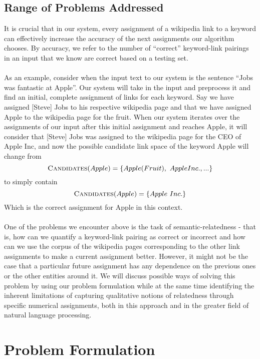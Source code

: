 \documentclass[twoside,11pt]{article}
\begin{document}
\subsection{Range of Problems Addressed}

It is crucial that in our system, every assignment of a wikipedia link to a keyword can effectively increase the accuracy of the next assignments our algorithm chooses. By accuracy, we refer to the number of ``correct'' keyword-link pairings in an input that we know are correct based on a testing set.
\\ \\
As an example, consider when the input text to our system is the sentence ``Jobs was fantastic at Apple''. Our system will take in the input and preprocess it and find an initial, complete assignment of links for each keyword. Say we have assigned [Steve] Jobs to his respective wikipedia page and that we have assigned Apple to the wikipedia page for the fruit. When our system iterates over the assignments of our input after this initial assignment and reaches Apple, it will consider that [Steve] Jobs was assigned to the wikipedia page for the CEO of Apple Inc, and now the possible candidate link space of the keyword Apple will change from
$$\mbox{{\sc Candidates}}(Apple) = \{Apple (Fruit), \ Apple Inc., ...\}$$
to simply contain
$$\mbox{{\sc Candidates}}(Apple) = \{Apple \ Inc.\}$$
Which is the correct assignment for Apple in this context.
\\ \\
One of the problems we encounter above is the task of semantic-relatedness - that is, how can we quantify a keyword-link pairing as correct or incorrect and how can we use the corpus of the wikipedia pages corresponding to the other link assignments to make a current assignment better. However, it might not be the case that a particular future assignment has any dependence on the previous ones or the other entities around it. We will discuss possible ways of solving this problem by using our problem formulation while at the same time identifying the inherent limitations of capturing qualitative notions of relatedness through specific numerical assignments, both in this approach and in the greater field of natural language processing.

\section{Problem Formulation}
\end{document}
